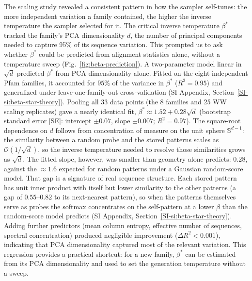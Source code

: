 \documentclass[11pt,onecolumn,twoside,lineno]{pnas-new}
\begin{document}
The scaling study revealed a consistent pattern in how the sampler self-tunes: the more independent variation a family contained, the higher the inverse temperature the sampler selected for it. The critical inverse temperature $\beta^*$ tracked the family's PCA dimensionality $d$, the number of principal components needed to capture 95\% of its sequence variation. This prompted us to ask whether $\beta^*$ could be predicted from alignment statistics alone, without a temperature sweep (Fig.~\ref{fig:beta-prediction}). A two-parameter model linear in $\sqrt{d}$ predicted $\beta^*$ from PCA dimensionality alone. Fitted on the eight independent Pfam families, it accounted for $95\%$ of the variance in $\beta^*$ ($R^2{=}0.95$) and generalized under leave-one-family-out cross-validation (SI Appendix, Section~\ref{SI-si:beta-star-theory}). Pooling all 33 data points (the 8 families and 25 WW scaling replicates) gave a nearly identical fit, $\beta^* \approx 1.52 + 0.28\sqrt{d}$ (bootstrap standard error [SE]: intercept $\pm 0.07$, slope $\pm 0.007$; $R^2{=}0.97$). The square-root dependence on $d$ follows from concentration of measure on the unit sphere $\mathbb{S}^{d-1}$: the similarity between a random probe and the stored patterns scales as $\mathcal{O}(1/\sqrt{d})$, so the inverse temperature needed to resolve those similarities grows as $\sqrt{d}$. The fitted slope, however, was smaller than geometry alone predicts: $0.28$, against the ${\approx}1.6$ expected for random patterns under a Gaussian random-score model. That gap is a signature of real sequence structure. Each stored pattern has unit inner product with itself but lower similarity to the other patterns (a gap of $0.55$--$0.82$ to its next-nearest pattern), so when the patterns themselves serve as probes the softmax concentrates on the self-pattern at a lower $\beta$ than the random-score model predicts (SI Appendix, Section~\ref{SI-si:beta-star-theory}). Adding further predictors (mean column entropy, effective number of sequences, spectral concentration) produced negligible improvement ($\Delta R^2 < 0.001$), indicating that PCA dimensionality captured most of the relevant variation. This regression provides a practical shortcut: for a new family, $\beta^*$ can be estimated from its PCA dimensionality and used to set the generation temperature without a sweep.
\end{document}
